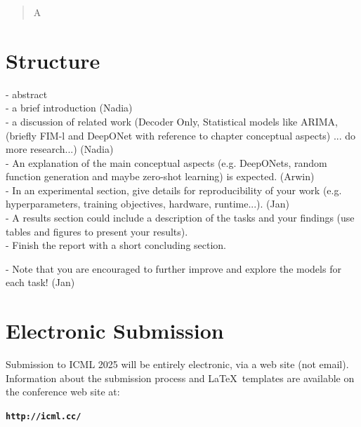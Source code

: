 \documentclass{article}
\theoremstyle{plain}
\theoremstyle{definition}
\theoremstyle{remark}
\begin{document}
\begin{abstract}
A
\end{abstract}

\section{Structure}

- abstract \\
- a brief introduction (Nadia) \\ 
- a discussion of related work (Decoder Only, Statistical models like ARIMA, (briefly FIM-l and DeepONet with reference to chapter conceptual aspects) ... do more research...) (Nadia) \\ 
- An explanation of the main conceptual aspects (e.g. DeepONets, random function generation and maybe zero-shot learning) is expected. (Arwin) \\ 
- In an experimental section, give details for reproducibility of your work (e.g. hyperparameters, training objectives, hardware, runtime...). (Jan) \\ 
- A results section could include a description of the tasks and your findings (use tables and figures to present your results). \\
- Finish the report with a short concluding section.

- Note that you are encouraged to further improve and explore the models for each task! (Jan)

\section{Electronic Submission}
\label{submission}

Submission to ICML 2025 will be entirely electronic, via a web site
(not email). Information about the submission process and \LaTeX\ templates
are available on the conference web site at:
\begin{center}
\textbf{\texttt{http://icml.cc/}}
\end{center}
\end{document}
